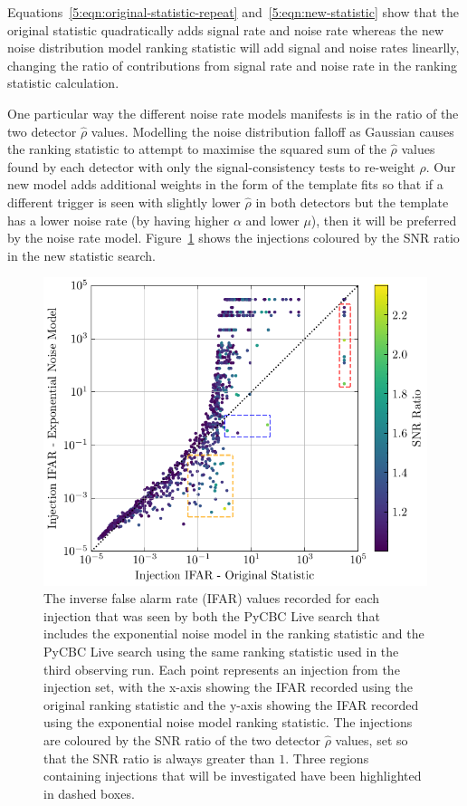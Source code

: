Equations~\ref{5:eqn:original-statistic-repeat} and~\ref{5:eqn:new-statistic} show that the original statistic quadratically adds signal rate and noise rate whereas the new noise distribution model ranking statistic will add signal and noise rates linearlly, changing the ratio of contributions from signal rate and noise rate in the ranking statistic calculation.

One particular way the different noise rate models manifests is in the ratio of the two detector $\hat{\rho}$ values. Modelling the noise distribution falloff as Gaussian causes the ranking statistic to attempt to maximise the squared sum of the $\hat{\rho}$ values found by each detector with only the signal-consistency tests to re-weight $\rho$. Our new model adds additional weights in the form of the template fits so that if a different trigger is seen with slightly lower $\hat{\rho}$ in both detectors but the template has a lower noise rate (by having higher $\alpha$ and lower $\mu$), then it will be preferred by the noise rate model. Figure~\ref{5:fig:ifar-ifar-snr-ratio} shows the injections coloured by the SNR ratio in the new statistic search.
%
\begin{figure}
  \centering
  \begin{minipage}[t]{1.0\linewidth}
    \includegraphics[width=1\textwidth]{images/5_pycbclive/regions/fits_only_ifar_vs_ifar_regions_snr_ratio.pdf}
  \end{minipage}
  \caption{The inverse false alarm rate (IFAR) values recorded for each injection that was seen by both the PyCBC Live search that includes the exponential noise model in the ranking statistic and the PyCBC Live search using the same ranking statistic used in the third observing run. Each point represents an injection from the injection set, with the x-axis showing the IFAR recorded using the original ranking statistic and the y-axis showing the IFAR recorded using the exponential noise model ranking statistic. The injections are coloured by the SNR ratio of the two detector $\hat{\rho}$ values, set so that the SNR ratio is always greater than $1$. Three regions containing injections that will be investigated have been highlighted in dashed boxes.}
  \label{5:fig:ifar-ifar-snr-ratio}
\end{figure}
